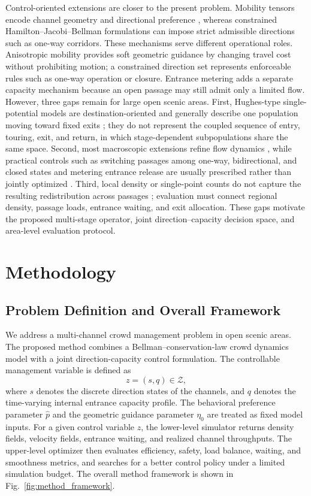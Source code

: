 \documentclass[lettersize,journal]{IEEEtran}
\begin{document}
Control-oriented extensions are closer to the present problem.
Mobility tensors encode channel geometry and directional preference \cite{cristiani2016,priuli2015control}, whereas constrained Hamilton--Jacobi--Bellman formulations can impose strict admissible directions such as one-way corridors.
These mechanisms serve different operational roles.
Anisotropic mobility provides soft geometric guidance by changing travel cost without prohibiting motion; a constrained direction set represents enforceable rules such as one-way operation or closure.
Entrance metering adds a separate capacity mechanism because an open passage may still admit only a limited flow.
However, three gaps remain for large open scenic areas.
First, Hughes-type single-potential models are destination-oriented and generally describe one population moving toward fixed exits \cite{hughes2003,RN2078}; they do not represent the coupled sequence of entry, touring, exit, and return, in which stage-dependent subpopulations share the same space.
Second, most macroscopic extensions refine flow dynamics \cite{RN2097,RN2099,RN2104}, while practical controls such as switching passages among one-way, bidirectional, and closed states and metering entrance release are usually prescribed rather than jointly optimized \cite{RN2118,RN2122}.
Third, local density or single-point counts do not capture the resulting redistribution across passages \cite{RN2124}; evaluation must connect regional density, passage loads, entrance waiting, and exit allocation.
These gaps motivate the proposed multi-stage operator, joint direction--capacity decision space, and area-level evaluation protocol.

\section{Methodology}
\label{sec:model}

\subsection{Problem Definition and Overall Framework}

We address a multi-channel crowd management problem in open scenic areas.
The proposed method combines a Bellman--conservation-law crowd dynamics model \cite{hughes2003,RN2078} with a joint direction-capacity control formulation.
The controllable management variable is defined as
\begin{equation}
z=(s,q)\in\mathcal Z,
\label{eq:control_variable}
\end{equation}
where $s$ denotes the discrete direction states of the channels, and $q$ denotes the time-varying internal entrance capacity profile.
The behavioral preference parameter $\hat p$ and the geometric guidance parameter $\eta_0$ are treated as fixed model inputs.
For a given control variable $z$, the lower-level simulator returns density fields, velocity fields, entrance waiting, and realized channel throughputs.
The upper-level optimizer then evaluates efficiency, safety, load balance, waiting, and smoothness metrics, and searches for a better control policy under a limited simulation budget.
The overall method framework is shown in Fig.~\ref{fig:method_framework}.
\end{document}
